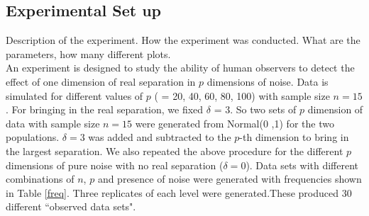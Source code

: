\documentclass[12]{article}
\begin{document}

\subsection{Experimental Set up}
{\color{red} Description of the experiment. How the experiment was conducted. What are the parameters, how many different plots.} \\
An experiment is designed to study the ability of human observers to detect the effect of one dimension of real separation in $p$ dimensions of noise. Data is simulated for different values of $p$  ( = 20, 40, 60, 80, 100) with sample size $ n  =  15$. For bringing in the real separation, we fixed $\delta $ = 3. So two sets of $p$ dimension of data with sample size $n = 15$ were generated from Normal(0 ,1) for the two populations.  $\delta = 3$ was added and subtracted to the $p$-th dimension to bring in the largest separation.  We also repeated the above procedure for the different $p$ dimensions of pure noise with no real separation ($\delta = 0$). Data sets with different combinations of $n$, $p$ and presence of noise were generated with frequencies shown in Table \ref{freq}. Three replicates of each level were generated.These produced 30 different ``observed data sets". 

\end{document}
